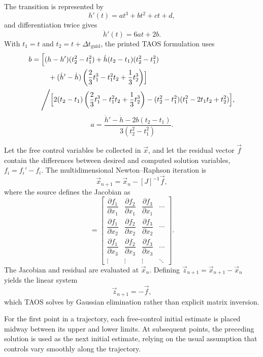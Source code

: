 The transition is represented by
\begin{equation}
  h'(t)=a t^3+b t^2+c t+d,
  \label{eq:cubic-guidance-state}
\end{equation}
and differentiation twice gives
\begin{equation}
  \ddot h'(t)=6at+2b.
  \label{eq:cubic-guidance-acceleration}
\end{equation}
With $t_1=t$ and $t_2=t+\Delta t_{\mathrm{guid}}$, the printed TAOS formulation
uses
\begin{equation}
\begin{aligned}
 b={}&\Bigl[(h-h')(t_2^2-t_1^2)
   +\dot h(t_2-t_1)(t_2^2-t_1^2)\\
 &\quad+(\dot h'-\dot h)
   \left(\frac{2}{3}t_1^3-t_1^2t_2+\frac{1}{3}t_2^3\right)\Bigr]\\
 &\Bigg/\Bigl[2(t_2-t_1)
   \left(\frac{2}{3}t_1^3-t_1^2t_2+\frac{1}{3}t_2^3\right)
   -(t_2^2-t_1^2)(t_1^2-2t_1t_2+t_2^2)\Bigr],
\end{aligned}
\label{eq:cubic-guidance-b}
\end{equation}
\begin{equation}
  a=\frac{\dot h'-\dot h-2b(t_2-t_1)}{3(t_2^2-t_1^2)}.
  \label{eq:cubic-guidance-a}
\end{equation}


Let the free control variables be collected in $\vec x$, and let the residual vector
$\vec f$ contain the differences between desired and computed solution variables,
$f_i=f_i'-f_i$. The multidimensional Newton--Raphson iteration is
\begin{equation}
  \vec x_{n+1}=\vec x_n-[J]^{-1}\vec f,
  \label{eq:guidance-newton-update}
\end{equation}
where the source defines the Jacobian as
\begin{equation}
  [J]=
  \begin{bmatrix}
    \dfrac{\partial f_1}{\partial x_1} &
    \dfrac{\partial f_2}{\partial x_1} &
    \dfrac{\partial f_3}{\partial x_1} & \cdots\\[0.9em]
    \dfrac{\partial f_1}{\partial x_2} &
    \dfrac{\partial f_2}{\partial x_2} &
    \dfrac{\partial f_3}{\partial x_2} & \cdots\\[0.9em]
    \dfrac{\partial f_1}{\partial x_3} &
    \dfrac{\partial f_2}{\partial x_3} &
    \dfrac{\partial f_3}{\partial x_3} & \cdots\\
    \vdots & \vdots & \vdots & \ddots
  \end{bmatrix}.
  \label{eq:guidance-jacobian}
\end{equation}
The Jacobian and residual are evaluated at $\vec x_n$. Defining
$\vec z_{n+1}=\vec x_{n+1}-\vec x_n$ yields the linear system
\begin{equation}
  [J]\vec z_{n+1}=-\vec f,
  \label{eq:guidance-gaussian-system}
\end{equation}
which TAOS solves by Gaussian elimination rather than explicit matrix inversion.

For the first point in a trajectory, each free-control initial estimate is placed midway
between its upper and lower limits. At subsequent points, the preceding solution is
used as the next initial estimate, relying on the usual assumption that controls vary
smoothly along the trajectory.
